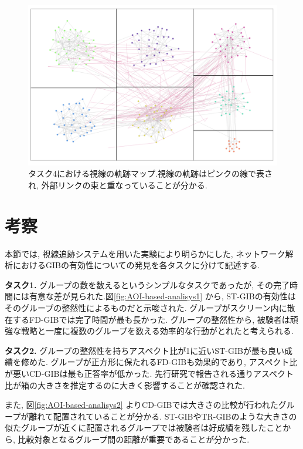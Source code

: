 \documentclass{kuee}
\begin{document}
\begin{figure}[t]
  \begin{center}
  \includegraphics[width=15cm]{./images/concentration.png}
  \caption{タスク4における視線の軌跡マップ.視線の軌跡はピンクの線で表され, 外部リンクの束と重なっていることが分かる. \label{fig:concentration}}
  \end{center}
\end{figure}

\section{考察}
本節では, 視線追跡システムを用いた実験により明らかにした, ネットワーク解析におけるGIBの有効性についての発見を各タスクに分けて記述する.

{\bf タスク1.} グループの数を数えるというシンプルなタスクであったが, その完了時間には有意な差が見られた.図\ref{fig:AOI-based-analisys1} から, ST-GIBの有効性はそのグループの整然性によるものだと示唆された.
グループがスクリーン内に散在するFD-GIBでは完了時間が最も長かった.
グループの整然性から, 被験者は頑強な戦略と一度に複数のグループを数える効率的な行動がとれたと考えられる.

{\bf タスク2.} グループの整然性を持ちアスペクト比が1に近いST-GIBが最も良い成績を修めた.
グループが正方形に保たれるFD-GIBも効果的であり, アスペクト比が悪いCD-GIBは最も正答率が低かった.
先行研究\cite{shneiderman1992tree}で報告される通りアスペクト比が箱の大きさを推定するのに大きく影響することが確認された.

また, 図\ref{fig:AOI-based-analisys2} よりCD-GIBでは大きさの比較が行われたグループが離れて配置されていることが分かる.
ST-GIBやTR-GIBのような大きさの似たグループが近くに配置されるグループでは被験者は好成績を残したことから, 比較対象となるグループ間の距離が重要であることが分かった.
\end{document}
